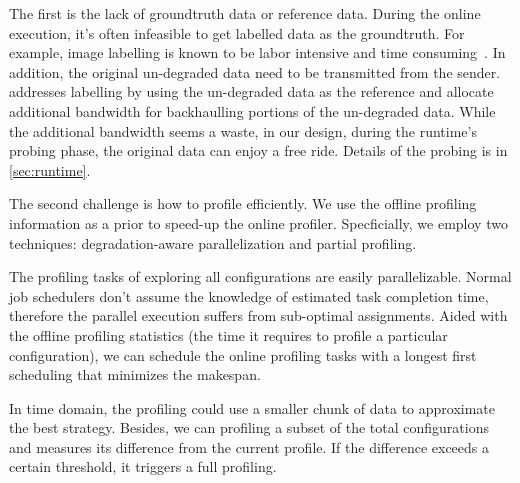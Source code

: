 The first is the lack of groundtruth data or reference data. During the online
execution, it's often infeasible to get labelled data as the groundtruth. For
example, image labelling is known to be labor intensive and time
consuming~\cite{russell2008labelme}. In addition, the original un-degraded data
need to be transmitted from the sender. \sysname{} addresses labelling by using
the un-degraded data as the reference and allocate additional bandwidth for
backhaulling portions of the un-degraded data. While the additional bandwidth
seems a waste, in our design, during the runtime's probing phase, the original
data can enjoy a free ride. Details of the probing is in \autoref{sec:runtime}.

The second challenge is how to profile efficiently. We use the offline profiling
information as a prior to speed-up the online profiler. Specficially, we employ
two techniques: degradation-aware parallelization and partial profiling.

 The profiling tasks of exploring all
configurations are easily parallelizable. Normal job schedulers don't assume the
knowledge of estimated task completion time, therefore the parallel execution
suffers from sub-optimal assignments. Aided with the offline profiling
statistics (the time it requires to profile a particular configuration), we can
schedule the online profiling tasks with a longest first scheduling that
minimizes the makespan.

 In time domain, the profiling could use a smaller
chunk of data to approximate the best strategy. Besides, we can profiling a
subset of the total configurations and measures its difference from the current
profile. If the difference exceeds a certain threshold, it triggers a full
profiling.

